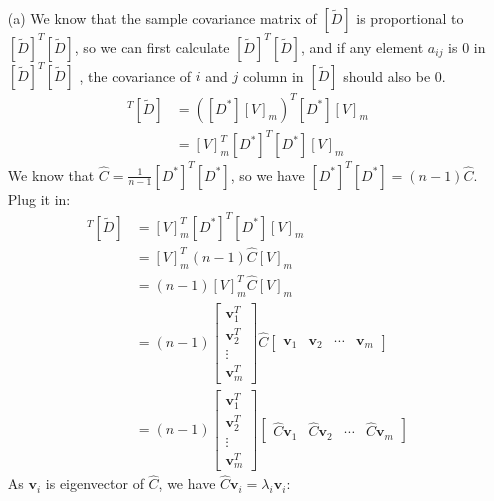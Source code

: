 \documentclass[11pt]{article}
\renewcommand{\vec}[1]{\mathbf{#1}}
\begin{document}
\begin{answertext}{14cm}{}
\begin{enumerate}
\item[(a)] We know that the sample covariance matrix of $[\tilde{D}]$ is proportional to $[\tilde{D}]^T [\tilde{D}]$, so we can first calculate $[\tilde{D}]^T [\tilde{D}]$, and if any element $a_{ij}$ is 0 in $[\tilde{D}]^T [\tilde{D}]$ , the covariance of $i$ and $j$ column in $[\tilde{D}]$ should also be 0.
\begin{align*}
[\tilde{D}]^T [\tilde{D}] &= ([D^*] [V]_m)^T[D^*] [V]_m\\
&= [V]_m^T [D^*]^T [D^*] [V]_m
\end{align*}
We know that $\hat{C} = \frac{1}{n-1}[D^*]^T [D^*]$, so we have $[D^*]^T [D^*]=(n-1)\hat{C}$. Plug it in:
\begin{align*}
[\tilde{D}]^T [\tilde{D}] &= [V]_m^T [D^*]^T [D^*] [V]_m\\
&= [V]_m^T (n-1)\hat{C} [V]_m\\
&= (n-1) [V]_m^T \hat{C} [V]_m\\
&= (n-1)
\begin{bmatrix}
\vec{v}_1^T\\
\vec{v}_2^T\\
\vdots\\
\vec{v}_m^T
\end{bmatrix}
\hat{C}
\begin{bmatrix}
\vec{v}_1 & \vec{v}_2 & \cdots & \vec{v}_m
\end{bmatrix}\\
&= (n-1)
\begin{bmatrix}
\vec{v}_1^T\\
\vec{v}_2^T\\
\vdots\\
\vec{v}_m^T
\end{bmatrix}
\begin{bmatrix}
\hat{C}\vec{v}_1 & \hat{C}\vec{v}_2 & \cdots & \hat{C}\vec{v}_m
\end{bmatrix}
\end{align*}
As $\vec{v}_i$ is eigenvector of $\hat{C}$, we have $\hat{C}\vec{v}_i = \lambda_i \vec{v}_i$:
\end{enumerate}
\end{answertext}
\end{document}
